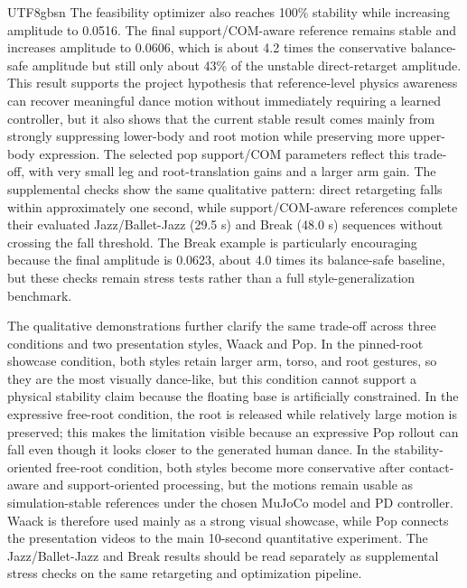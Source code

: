 \documentclass[conference]{IEEEtran}
\begin{document}
\begin{CJK*}{UTF8}{gbsn}
The feasibility optimizer also reaches 100\% stability while increasing amplitude to 0.0516. The final support/COM-aware reference remains stable and increases amplitude to 0.0606, which is about 4.2 times the conservative balance-safe amplitude but still only about 43\% of the unstable direct-retarget amplitude. This result supports the project hypothesis that reference-level physics awareness can recover meaningful dance motion without immediately requiring a learned controller, but it also shows that the current stable result comes mainly from strongly suppressing lower-body and root motion while preserving more upper-body expression. The selected pop support/COM parameters reflect this trade-off, with very small leg and root-translation gains and a larger arm gain. The supplemental checks show the same qualitative pattern: direct retargeting falls within approximately one second, while support/COM-aware references complete their evaluated Jazz/Ballet-Jazz (29.5 s) and Break (48.0 s) sequences without crossing the fall threshold. The Break example is particularly encouraging because the final amplitude is 0.0623, about 4.0 times its balance-safe baseline, but these checks remain stress tests rather than a full style-generalization benchmark.

The qualitative demonstrations further clarify the same trade-off across three conditions and two presentation styles, Waack and Pop. In the pinned-root showcase condition, both styles retain larger arm, torso, and root gestures, so they are the most visually dance-like, but this condition cannot support a physical stability claim because the floating base is artificially constrained. In the expressive free-root condition, the root is released while relatively large motion is preserved; this makes the limitation visible because an expressive Pop rollout can fall even though it looks closer to the generated human dance. In the stability-oriented free-root condition, both styles become more conservative after contact-aware and support-oriented processing, but the motions remain usable as simulation-stable references under the chosen MuJoCo model and PD controller. Waack is therefore used mainly as a strong visual showcase, while Pop connects the presentation videos to the main 10-second quantitative experiment. The Jazz/Ballet-Jazz and Break results should be read separately as supplemental stress checks on the same retargeting and optimization pipeline.


\end{CJK*}
\end{document}
